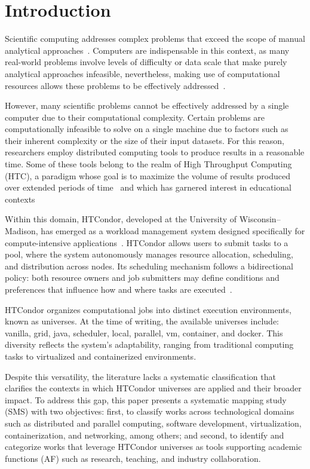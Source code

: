 \section{Introduction}\label{sec:introduccion}
Scientific computing addresses complex problems that exceed the scope of manual analytical approaches~\cite{landau01}. Computers are indispensable in this context, as many real-world problems involve levels of difficulty or data scale that make purely analytical approaches infeasible, nevertheless, making use of computational resources allows these problems to be effectively addressed~\cite{landau01}.


However, many scientific problems cannot be effectively addressed by a single computer due to their computational complexity. Certain problems are computationally infeasible to solve on a single machine due to factors such as their inherent complexity or the size of their input datasets. For this reason, researchers employ distributed computing tools to produce results in a reasonable time. Some of these tools belong to the realm of High Throughput Computing (HTC), a paradigm whose goal is to maximize the volume of results produced over extended periods of time~\cite{juve-01} and which has garnered interest in educational contexts~\cite{Senol-01}


Within this domain, HTCondor, developed at the University of Wisconsin–Madison, has emerged as a workload management system designed specifically for compute-intensive applications~\cite{chang-01, htcondor-description}. HTCondor allows users to submit tasks to a pool, where the system autonomously manages resource allocation, scheduling, and distribution across nodes. Its scheduling mechanism follows a bidirectional policy: both resource owners and job submitters may define conditions and preferences that influence how and where tasks are executed~\cite{htcondor-description}.


HTCondor organizes computational jobs into distinct execution environments, known as universes. At the time of writing, the available universes include: vanilla, grid, java, scheduler, local, parallel, vm, container, and docker. This diversity reflects the system’s adaptability, ranging from traditional computing tasks to virtualized and containerized environments.


Despite this versatility, the literature lacks a systematic classification that clarifies the contexts in which HTCondor universes are applied and their broader impact. To address this gap, this paper presents a systematic mapping study (SMS) with two objectives: first, to classify works across technological domains such as distributed and parallel computing, software development, virtualization, containerization, and networking, among others; and second, to identify and categorize works that leverage HTCondor universes as tools supporting academic functions (AF) such as research, teaching, and industry collaboration.


